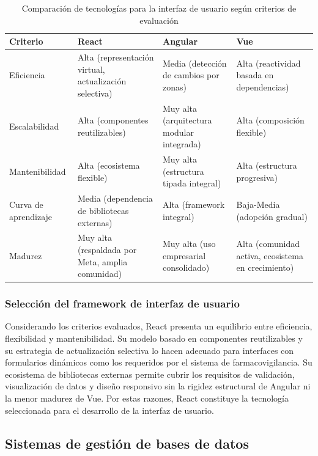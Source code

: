 \begin{table}[htbp]
	\centering
	\caption{Comparación de tecnologías para la interfaz de usuario según criterios de evaluación}
	\label{tab:comparacion_frontend}
	\renewcommand{\arraystretch}{1.3}
	\begin{tabular}{|p{3.2cm}|p{3.5cm}|p{3.5cm}|p{3.5cm}|}
	\hline
	\textbf{Criterio} & \textbf{React} & \textbf{Angular} & \textbf{Vue} \\[6pt]
	\hline
		Eficiencia & Alta (representación virtual, actualización selectiva) & Media (detección de cambios por zonas) & Alta (reactividad basada en dependencias) \\ \hline
		Escalabilidad & Alta (componentes reutilizables) & Muy alta (arquitectura modular integrada) & Alta (composición flexible) \\ \hline
		Mantenibilidad & Alta (ecosistema flexible) & Muy alta (estructura tipada integral) & Alta (estructura progresiva) \\ \hline
		Curva de aprendizaje & Media (dependencia de bibliotecas externas) & Alta (framework integral) & Baja-Media (adopción gradual) \\ \hline
		Madurez & Muy alta (respaldada por Meta, amplia comunidad) & Muy alta (uso empresarial consolidado) & Alta (comunidad activa, ecosistema en crecimiento) \\ \hline
	\end{tabular}
\end{table}


\subsubsection{Selección del framework de interfaz de usuario}

Considerando los criterios evaluados, React presenta un equilibrio entre eficiencia, flexibilidad y mantenibilidad. Su modelo basado en componentes reutilizables y su estrategia de actualización selectiva lo hacen adecuado para interfaces con formularios dinámicos como los requeridos por el sistema de farmacovigilancia. Su ecosistema de bibliotecas externas permite cubrir los requisitos de validación, visualización de datos y diseño responsivo sin la rigidez estructural de Angular ni la menor madurez de Vue. Por estas razones, React constituye la tecnología seleccionada para el desarrollo de la interfaz de usuario.

\subsection{Sistemas de gestión de bases de datos}
\label{subsection:bases_datos}

